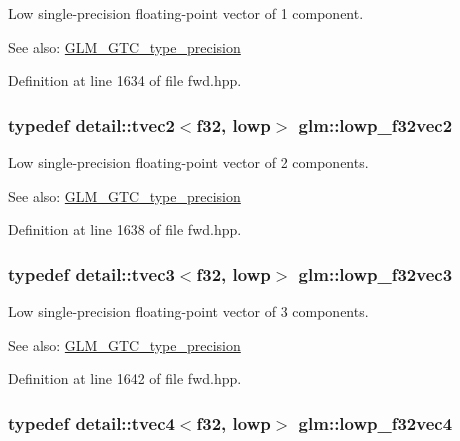 Low single-precision floating-point vector of 1 component. \begin{Desc}
\item[See also:]\hyperlink{group__gtc__type__precision}{GLM\_\-GTC\_\-type\_\-precision} \end{Desc}


Definition at line 1634 of file fwd.hpp.\hypertarget{group__gtc__type__precision_g7faa2c9884c87b1e6512a966adad69e4}{
\subsubsection[lowp\_\-f32vec2]{\setlength{\rightskip}{0pt plus 5cm}typedef detail::tvec2$<$f32, lowp$>$ {\bf glm::lowp\_\-f32vec2}}}
\label{group__gtc__type__precision_g7faa2c9884c87b1e6512a966adad69e4}


Low single-precision floating-point vector of 2 components. \begin{Desc}
\item[See also:]\hyperlink{group__gtc__type__precision}{GLM\_\-GTC\_\-type\_\-precision} \end{Desc}


Definition at line 1638 of file fwd.hpp.\hypertarget{group__gtc__type__precision_g1f878d91a5f5ab92c756244b62af7248}{
\subsubsection[lowp\_\-f32vec3]{\setlength{\rightskip}{0pt plus 5cm}typedef detail::tvec3$<$f32, lowp$>$ {\bf glm::lowp\_\-f32vec3}}}
\label{group__gtc__type__precision_g1f878d91a5f5ab92c756244b62af7248}


Low single-precision floating-point vector of 3 components. \begin{Desc}
\item[See also:]\hyperlink{group__gtc__type__precision}{GLM\_\-GTC\_\-type\_\-precision} \end{Desc}


Definition at line 1642 of file fwd.hpp.\hypertarget{group__gtc__type__precision_g59f7292d7ed0b7df72e6aa31010e2648}{
\subsubsection[lowp\_\-f32vec4]{\setlength{\rightskip}{0pt plus 5cm}typedef detail::tvec4$<$f32, lowp$>$ {\bf glm::lowp\_\-f32vec4}}}
\label{group__gtc__type__precision_g59f7292d7ed0b7df72e6aa31010e2648}


